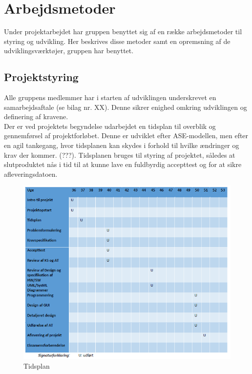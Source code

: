 \chapter{Arbejdsmetoder}\label{kapitel_Arbejdsmetoder}
Under projektarbejdet har gruppen benyttet sig af en række arbejdsmetoder til styring og udvikling.
Her beskrives disse metoder samt en opremsning af de udviklingsværktøjer, gruppen har benyttet.

\section{Projektstyring}
Alle gruppens medlemmer har i starten af udviklingen underskrevet en samarbejdsaftale (se bilag nr. XX). Denne sikrer enighed omkring udviklingen og definering af kravene. \\
\newline
Der er ved projektets begyndelse udarbejdet en tidsplan til overblik og gennemførsel af projektforløbet. Denne er udviklet efter ASE-modellen, men efter en agil tankegang, hvor tidsplanen kan skydes i forhold til hvilke ændringer og krav der kommer. (???). Tidsplanen bruges til styring af projektet, således at slutproduktet nås i tid til at kunne lave en fuldbyrdig accepttest og for at sikre afleveringsdatoen. \\

\begin{figure}[H]
\centering
\includegraphics[scale=0.70]{tidsplan.PNG}
\caption{Tidsplan}
\end{figure}

